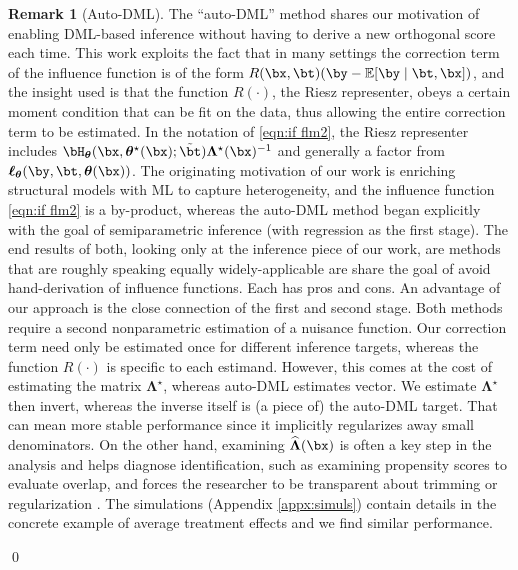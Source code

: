 \documentclass[12pt]{article}
\numberwithin{equation}{section}
\theoremstyle{definition}
\newtheorem{remarkTmp}{Remark}
\newenvironment{remark}
	{\medskip  \begin{remarkTmp} 	}
	{ 
		\renewcommand{\qedsymbol}{$\clubsuit$}
		\qed 
		\end{remarkTmp} 
	}
\newcommand{\E}{\mathbb{E}}
\newcommand{\btheta}{\boldsymbol{\theta}}
\newcommand{\bL}{\boldsymbol{\Lambda}}
\newcommand{\bttrue}{\btheta^\star}
\newcommand{\bLtrue}{\bL^\star}
\newcommand{\btstar}{\tilde{\bt}}
\newcommand{\bLhat}{\widehat{\bL}}
\begin{document}
\begin{remark}[Auto-DML]
    \label{rem:auto DML}
    The ``auto-DML'' method shares our motivation of enabling DML-based inference without having to derive a new orthogonal score each time. This work \cite[and references therein]{Chernozhukov-etal2024_WP} exploits the fact that in many settings the correction term of the influence function is of the form $R(\bx,\bt) (\by - \E[\by \mid \bt, \bx])$, and the insight used is that the function $R(\cdot)$, the Riesz representer, obeys a certain moment condition that can be fit on the data, thus allowing the entire correction term to be estimated. In the notation of \eqref{eqn:if flm2}, the Riesz representer includes $\bH_{\btheta}(\bx, \bttrue(\bx ); \btstar) \bLtrue(\bx)^{-1}$ and generally a factor from $\bm{\ell}_{\btheta}(\by,\bt, \btheta(\bx))$. The originating motivation of our work is enriching structural models with ML to capture heterogeneity, and the influence function \eqref{eqn:if flm2} is a by-product, whereas the auto-DML method began explicitly with the goal of semiparametric inference (with regression as the first stage). The end results of both, looking only at the inference piece of our work, are methods that are roughly speaking equally widely-applicable are share the goal of avoid hand-derivation of influence functions. Each has pros and cons. An advantage of our approach is the close connection of the first and second stage. Both methods require a second nonparametric estimation of a nuisance function. Our correction term need only be estimated once for different inference targets, whereas the function $R(\cdot)$ is specific to each estimand. However, this comes at the cost of estimating the matrix $\bLtrue$, whereas auto-DML estimates vector. We estimate $\bLtrue$ then invert, whereas the inverse itself is (a piece of) the auto-DML target. That can mean more stable performance since it implicitly regularizes away small denominators. On the other hand, examining $\bLhat(\bx)$ is often a key step in the analysis and helps diagnose identification, such as examining propensity scores to evaluate overlap, and forces the researcher to be transparent about trimming or regularization \cite{Ma-Wang2020_JASA,Hetzenecker-Osterhaus2024_WP}.  The simulations (Appendix \ref{appx:simuls}) contain details in the concrete example of average treatment effects and we find similar performance. 
\end{remark}
\end{document}
